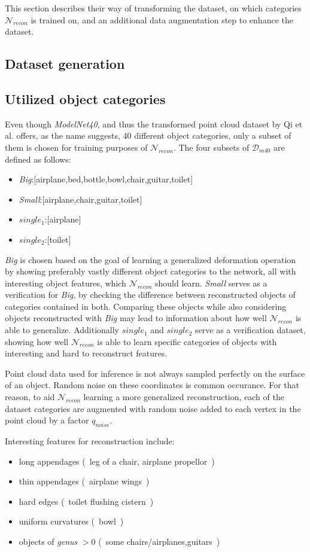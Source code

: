    This section describes their way of transforming the dataset, on which categories
   $\mathcal{N}_{recon}$ is trained on, and an additional data augmentation step to
   enhance the dataset.

\subsection{Dataset generation}
\subsection{Utilized object categories}
\label{sec:categ}
Even though \emph{ModelNet40}, and thus the transformed point cloud dataset by Qi et al. offers, as the name suggests,
40 different object categories, only a subset of them is chosen for training purposes of $\mathcal{N}_{recon}$. 
The four subsets of $\mathcal{D}_{m40}$ are defined as follows:
\begin{itemize}
   \item \emph{Big}:[airplane,bed,bottle,bowl,chair,guitar,toilet]
   \item \emph{Small}:[airplane,chair,guitar,toilet]
   \item \emph{$single_1$}:[airplane]
   \item \emph{$single_2$}:[toilet]
\end{itemize}
\emph{Big} is chosen based on the goal of learning a generalized deformation operation by showing preferably vastly different object categories
to the network, all with interesting object features, which $\mathcal{N}_{recon}$ should learn.
\emph{Small} serves as a verification for \emph{Big}, by checking the difference between reconstructed objects of categories contained in both.
Comparing these objects while also considering objects reconstructed with \emph{Big} may lead to information about how well $\mathcal{N}_{recon}$ is
able to generalize. 
Additionally $single_1$ and $single_2$ serve as a verification dataset, showing how well $\mathcal{N}_{recon}$ is able to learn specific categories of 
objects with interesting and hard to reconstruct features.

Point cloud data used for inference is not always sampled perfectly on the surface of an object. Random noise on these coordinates is common occurance.
For that reason, to aid $\mathcal{N}_{recon}$ learning a more generalized reconstruction, each of the dataset categories are
 augmented with random noise added to each vertex in the point cloud by a factor $q_{noise}$.

 Interesting features for reconstruction include:
 \begin{itemize}
   \item long appendages (~leg of a chair, airplane propellor~)
   \item thin appendages (~airplane wings~)
   \item hard edges (~toilet flushing cistern~)
   \item uniform curvatures (~bowl~)
   \item objects of \emph{genus} $>0$ (~some chairs/airplanes,guitars~)
 \end{itemize}
